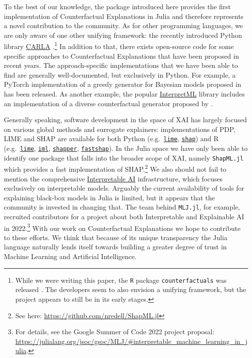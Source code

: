 \documentclass{juliacon}
\begin{document}
To the best of our knowledge, the package introduced here provides the
first implementation of Counterfactual Explanations in Julia and
therefore represents a novel contribution to the community. As for other
programming languages, we are only aware of one other unifying
framework: the recently introduced Python library
\href{https://carla-counterfactual-and-recourse-library.readthedocs.io/en/latest/?badge=latest}{CARLA}
\cite{pawelczyk2021carla}.\footnote{While we were writing this paper,
  the \texttt{R} package \texttt{counterfactuals} was released
  \cite{dandle2023counterfactuals}. The developers seem to also envision
  a unifying framework, but the project appears to still be in its early
  stages.} In addition to that, there exists open-source code for some
specific approaches to Counterfactual Explanations that have been
proposed in recent years. The approach-specific implementations that we
have been able to find are generally well-documented, but exclusively in
Python. For example, a PyTorch implementation of a greedy generator for
Bayesian models proposed in \cite{schut2021generating} has been
released. As another example, the popular
\href{https://github.com/interpretml}{InterpretML} library includes an
implementation of a diverse counterfactual generator proposed by
\cite{mothilal2020explaining}.

Generally speaking, software development in the space of XAI has largely
focused on various global methods and surrogate explainers:
implementations of PDP, LIME and SHAP are available for both Python
(e.g.~\href{https://github.com/marcotcr/lime}{\texttt{lime}},
\href{https://github.com/slundberg/shap}{\texttt{shap}}) and R
(e.g.~\href{https://cran.r-project.org/web/packages/lime/index.html}{\texttt{lime}},
\href{https://cran.r-project.org/web/packages/lime/index.html}{\texttt{iml}},
\href{https://modeloriented.github.io/shapper/}{\texttt{shapper}},
\href{https://github.com/bgreenwell/fastshap}{\texttt{fastshap}}). In
the Julia space we have only been able to identify one package that
falls into the broader scope of XAI, namely \texttt{ShapML.jl} which
provides a fast implementation of SHAP.\footnote{See here:
  \url{https://github.com/nredell/ShapML.jl}} We also should not fail to
mention the comprehensive
\href{https://docs.interpretable.ai/stable/IAIBase/data/}{Interpretable
AI} infrastructure, which focuses exclusively on interpretable models.
Arguably the current availability of tools for explaining black-box
models in Julia is limited, but it appears that the community is
invested in changing that. The team behind \texttt{MLJ.jl}, for example,
recruited contributors for a project about both Interpretable and
Explainable AI in 2022.\footnote{For details, see the Google Summer of
  Code 2022 project proposal:
  \url{https://julialang.org/jsoc/gsoc/MLJ/\#interpretable_machine_learning_in_julia}.}
With our work on Counterfactual Explanations we hope to contribute to
these efforts. We think that because of its unique transparency the
Julia language naturally lends itself towards building a greater degree
of trust in Machine Learning and Artificial Intelligence.
\end{document}
